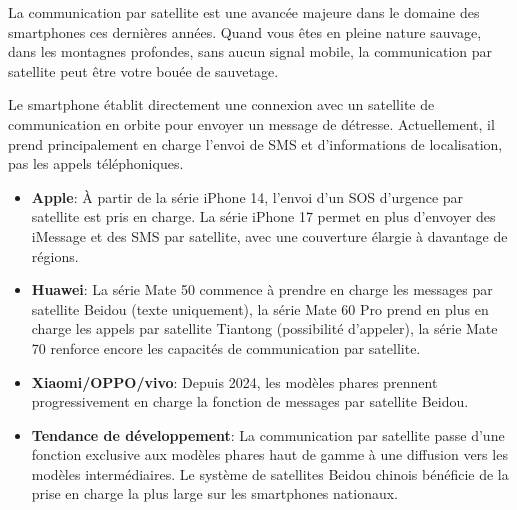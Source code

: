 


La communication par satellite est une avancée majeure dans le domaine des smartphones ces dernières années. Quand vous êtes en pleine nature sauvage, dans les montagnes profondes, sans aucun signal mobile, la communication par satellite peut être votre bouée de sauvetage.


Le smartphone établit directement une connexion avec un satellite de communication en orbite pour envoyer un message de détresse. Actuellement, il prend principalement en charge l'envoi de SMS et d'informations de localisation, pas les appels téléphoniques.


\begin{itemize}
  \item \textbf{Apple}: À partir de la série iPhone 14, l'envoi d'un SOS d'urgence par satellite est pris en charge. La série iPhone 17 permet en plus d'envoyer des iMessage et des SMS par satellite, avec une couverture élargie à davantage de régions.
  \item \textbf{Huawei}: La série Mate 50 commence à prendre en charge les messages par satellite Beidou (texte uniquement), la série Mate 60 Pro prend en plus en charge les appels par satellite Tiantong (possibilité d'appeler), la série Mate 70 renforce encore les capacités de communication par satellite.
  \item \textbf{Xiaomi/OPPO/vivo}: Depuis 2024, les modèles phares prennent progressivement en charge la fonction de messages par satellite Beidou.
  \item \textbf{Tendance de développement}: La communication par satellite passe d'une fonction exclusive aux modèles phares haut de gamme à une diffusion vers les modèles intermédiaires. Le système de satellites Beidou chinois bénéficie de la prise en charge la plus large sur les smartphones nationaux.
\end{itemize}

